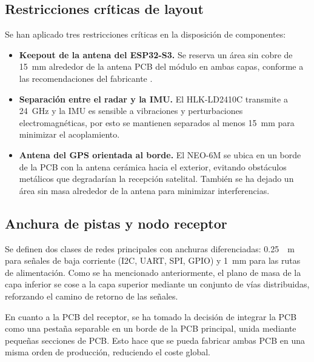 \subsection{Restricciones críticas de layout}
\label{sec:layout_restricciones}

Se han aplicado tres restricciones críticas en la disposición de componentes:

\begin{itemize}
    \item \textbf{Keepout de la antena del ESP32-S3.} Se reserva un área sin
    cobre de \SI{15}{\milli\meter} alrededor de la antena PCB del módulo en
    ambas capas, conforme a las recomendaciones del fabricante
    \cite{ds_esp32s3}.

    \item \textbf{Separación entre el radar y la IMU.} El HLK-LD2410C
    transmite a \SI{24}{\giga\hertz} y la IMU es sensible a vibraciones y
    perturbaciones electromagnéticas, por esto se mantienen separados al menos
    \SI{15}{\milli\meter} para minimizar el acoplamiento.

    \item \textbf{Antena del GPS orientada al borde.} El NEO-6M se ubica en
    un borde de la PCB con la antena cerámica hacia el exterior, evitando
    obstáculos metálicos que degradarían la recepción satelital. También se ha dejado un área sin masa alrededor de la antena para minimizar interferencias.
\end{itemize}

\newpage

\subsection{Anchura de pistas y nodo receptor}
\label{sec:layout_pistas}

Se definen dos clases de redes principales con anchuras diferenciadas: \SI{0.25}{\milli
\meter} para señales de baja corriente (I2C, UART, SPI, GPIO) y \SI{1}{
\milli\meter} para las rutas de alimentación. Como se ha mencionado anteriormente, el plano de
masa de la capa inferior se cose a la capa superior mediante un conjunto de
vías distribuidas, reforzando el camino de retorno de las señales.

En cuanto a la PCB del receptor, se ha tomado la decisión de integrar la PCB como una pestaña separable en un borde de la PCB principal, unida mediante pequeñas secciones de PCB. Esto hace que se pueda fabricar ambas PCB en una misma orden de producción, reduciendo el coste global.

